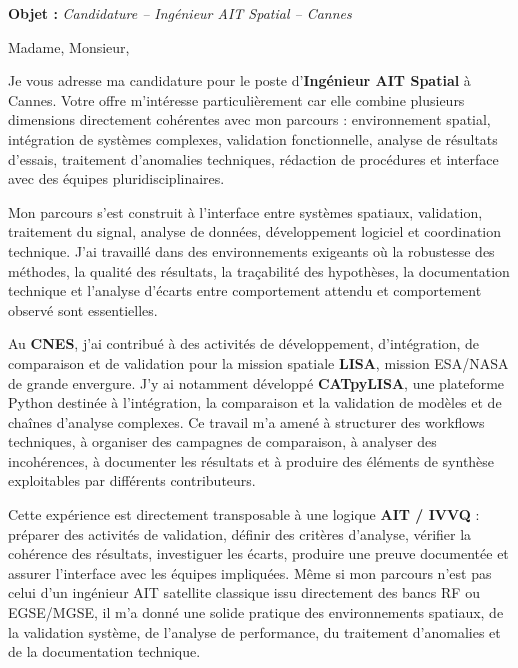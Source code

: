 \documentclass[11pt,a4paper]{altacv}
\begin{document}
\makecvheader
\vspace{-0.6cm}

\vspace{-0.4cm}

{\color{accent}\textbf{Objet :}} \textit{Candidature -- Ingénieur AIT Spatial -- Cannes}

{\color{body}

Madame, Monsieur,

Je vous adresse ma candidature pour le poste d'\textbf{Ingénieur AIT Spatial} à Cannes. Votre offre m'intéresse particulièrement car elle combine plusieurs dimensions directement cohérentes avec mon parcours : environnement spatial, intégration de systèmes complexes, validation fonctionnelle, analyse de résultats d'essais, traitement d'anomalies techniques, rédaction de procédures et interface avec des équipes pluridisciplinaires.

Mon parcours s'est construit à l'interface entre systèmes spatiaux, validation, traitement du signal, analyse de données, développement logiciel et coordination technique. J'ai travaillé dans des environnements exigeants où la robustesse des méthodes, la qualité des résultats, la traçabilité des hypothèses, la documentation technique et l'analyse d'écarts entre comportement attendu et comportement observé sont essentielles.

Au \textbf{CNES}, j'ai contribué à des activités de développement, d'intégration, de comparaison et de validation pour la mission spatiale \textbf{LISA}, mission ESA/NASA de grande envergure. J'y ai notamment développé \textbf{CATpyLISA}, une plateforme Python destinée à l'intégration, la comparaison et la validation de modèles et de chaînes d'analyse complexes. Ce travail m'a amené à structurer des workflows techniques, à organiser des campagnes de comparaison, à analyser des incohérences, à documenter les résultats et à produire des éléments de synthèse exploitables par différents contributeurs.

Cette expérience est directement transposable à une logique \textbf{AIT / IVVQ} : préparer des activités de validation, définir des critères d'analyse, vérifier la cohérence des résultats, investiguer les écarts, produire une preuve documentée et assurer l'interface avec les équipes impliquées. Même si mon parcours n'est pas celui d'un ingénieur AIT satellite classique issu directement des bancs RF ou EGSE/MGSE, il m'a donné une solide pratique des environnements spatiaux, de la validation système, de l'analyse de performance, du traitement d'anomalies et de la documentation technique.

}
\end{document}
